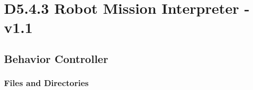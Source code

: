\documentclass{CSSRforAfrica}
\begin{document}

\section{D5.4.3 Robot Mission Interpreter - v1.1} 
\subsection{Behavior Controller} 
\label{subsection:behaviour_controller}


\subsubsection{Files and Directories}
 
\end{document}
